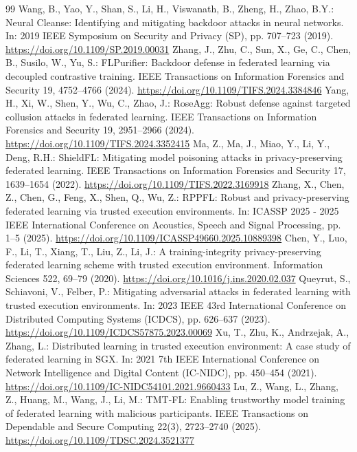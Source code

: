 \documentclass[10pt,a4paper,UTF8,fontset=fandol]{ctexart}
\begin{document}
\begin{thebibliography}{99}
     Wang, B., Yao, Y., Shan, S., Li, H., Viswanath, B., Zheng, H., Zhao, B.Y.: Neural Cleanse: Identifying and mitigating backdoor attacks in neural networks. In: 2019 IEEE Symposium on Security and Privacy (SP), pp. 707--723 (2019). \url{https://doi.org/10.1109/SP.2019.00031}
     Zhang, J., Zhu, C., Sun, X., Ge, C., Chen, B., Susilo, W., Yu, S.: FLPurifier: Backdoor defense in federated learning via decoupled contrastive training. IEEE Transactions on Information Forensics and Security 19, 4752--4766 (2024). \url{https://doi.org/10.1109/TIFS.2024.3384846}
     Yang, H., Xi, W., Shen, Y., Wu, C., Zhao, J.: RoseAgg: Robust defense against targeted collusion attacks in federated learning. IEEE Transactions on Information Forensics and Security 19, 2951--2966 (2024). \url{https://doi.org/10.1109/TIFS.2024.3352415}
     Ma, Z., Ma, J., Miao, Y., Li, Y., Deng, R.H.: ShieldFL: Mitigating model poisoning attacks in privacy-preserving federated learning. IEEE Transactions on Information Forensics and Security 17, 1639--1654 (2022). \url{https://doi.org/10.1109/TIFS.2022.3169918}
     Zhang, X., Chen, Z., Chen, G., Feng, X., Shen, Q., Wu, Z.: RPPFL: Robust and privacy-preserving federated learning via trusted execution environments. In: ICASSP 2025 - 2025 IEEE International Conference on Acoustics, Speech and Signal Processing, pp. 1--5 (2025). \url{https://doi.org/10.1109/ICASSP49660.2025.10889398}
     Chen, Y., Luo, F., Li, T., Xiang, T., Liu, Z., Li, J.: A training-integrity privacy-preserving federated learning scheme with trusted execution environment. Information Sciences 522, 69--79 (2020). \url{https://doi.org/10.1016/j.ins.2020.02.037}
     Queyrut, S., Schiavoni, V., Felber, P.: Mitigating adversarial attacks in federated learning with trusted execution environments. In: 2023 IEEE 43rd International Conference on Distributed Computing Systems (ICDCS), pp. 626--637 (2023). \url{https://doi.org/10.1109/ICDCS57875.2023.00069}
     Xu, T., Zhu, K., Andrzejak, A., Zhang, L.: Distributed learning in trusted execution environment: A case study of federated learning in SGX. In: 2021 7th IEEE International Conference on Network Intelligence and Digital Content (IC-NIDC), pp. 450--454 (2021). \url{https://doi.org/10.1109/IC-NIDC54101.2021.9660433}
     Lu, Z., Wang, L., Zhang, Z., Huang, M., Wang, J., Li, M.: TMT-FL: Enabling trustworthy model training of federated learning with malicious participants. IEEE Transactions on Dependable and Secure Computing 22(3), 2723--2740 (2025). \url{https://doi.org/10.1109/TDSC.2024.3521377}

\end{thebibliography}
\end{document}
